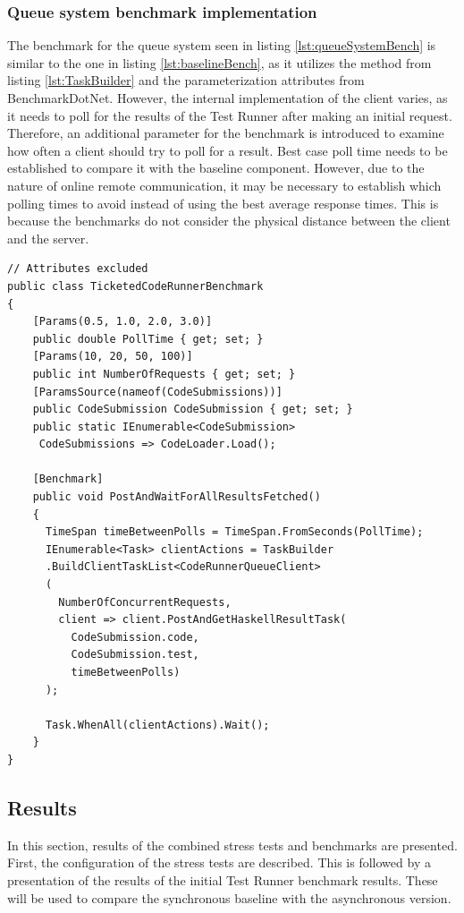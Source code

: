 \subsubsection{Queue system benchmark implementation}
The benchmark for the queue system seen in listing \ref{lst:queueSystemBench} is similar to the one in listing \ref{lst:baselineBench}, as it utilizes the method from listing \ref{lst:TaskBuilder} and the parameterization attributes from BenchmarkDotNet.
However, the internal implementation of the client varies, as it needs to poll for the results of the Test Runner after making an initial request.
Therefore, an additional parameter for the benchmark is introduced to examine how often a client should try to poll for a result.
Best case poll time needs to be established to compare it with the baseline component. 
However, due to the nature of online remote communication, it may be necessary to establish which polling times to avoid instead of using the best average response times.
This is because the benchmarks do not consider the physical distance between the client and the server.
\begin{lstlisting}[language=CSharp, escapechar=~, caption={C\# code showing the benchmark implementation for the asynchronous backend}, label={lst:queueSystemBench}]
// Attributes excluded
public class TicketedCodeRunnerBenchmark
{
    [Params(0.5, 1.0, 2.0, 3.0)] 
    public double PollTime { get; set; }
    [Params(10, 20, 50, 100)] 
    public int NumberOfRequests { get; set; }
    [ParamsSource(nameof(CodeSubmissions))] 
    public CodeSubmission CodeSubmission { get; set; }
    public static IEnumerable<CodeSubmission>
     CodeSubmissions => CodeLoader.Load();

    [Benchmark]
    public void PostAndWaitForAllResultsFetched()
    {
      TimeSpan timeBetweenPolls = TimeSpan.FromSeconds(PollTime);
      IEnumerable<Task> clientActions = TaskBuilder
      .BuildClientTaskList<CodeRunnerQueueClient>
      (
        NumberOfConcurrentRequests, 
        client => client.PostAndGetHaskellResultTask(
          CodeSubmission.code,
          CodeSubmission.test,
          timeBetweenPolls)
      );

      Task.WhenAll(clientActions).Wait();
    }
}
\end{lstlisting}

\subsection{Results}
In this section, results of the combined stress tests and benchmarks are presented.
First, the configuration of the stress tests are described.
This is followed by a presentation of the results of the initial Test Runner benchmark results.
These will be used to compare the synchronous baseline with the asynchronous version.

